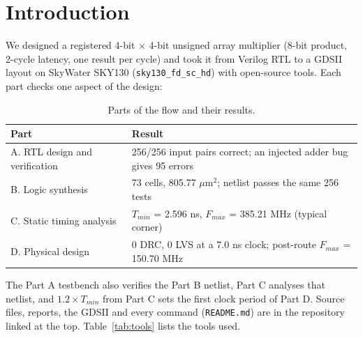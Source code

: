 \documentclass[10pt,a4paper,twocolumn]{article}
\newcommand{\umsq}{$\mu$m$^2$}
\begin{document}

\section{Introduction}

We designed a registered 4-bit $\times$ 4-bit unsigned array multiplier (8-bit product, 2-cycle latency,
one result per cycle) and took it from Verilog RTL to a GDSII layout on SkyWater SKY130 (\texttt{sky130\_fd\_sc\_hd})
with open-source tools. Each part checks one aspect of the design:

\begin{table}[!htbp]
\centering
\begin{tabularx}{\columnwidth}{>{\raggedright\arraybackslash}p{2.7cm}Y}
\toprule
\textbf{Part} & \textbf{Result} \\
\midrule
A. RTL design and verification & 256/256 input pairs correct; an injected adder bug gives 95 errors \\
B. Logic synthesis & 73 cells, 805.77 \umsq; netlist passes the same 256 tests \\
C. Static timing analysis & $T_{min}$ = 2.596 ns, $F_{max}$ = 385.21 MHz (typical corner) \\
D. Physical design & 0 DRC, 0 LVS at a 7.0 ns clock; post-route $F_{max}$ = 150.70 MHz \\
\bottomrule
\end{tabularx}
\caption{Parts of the flow and their results.}\label{tab:flow}
\end{table}

The Part A testbench also verifies the Part B netlist, Part C analyses that netlist, and $1.2 \times T_{min}$
from Part C sets the first clock period of Part D. Source files, reports, the GDSII and every command
(\texttt{README.md}) are in the repository linked at the top. Table~\ref{tab:tools} lists the tools used.
\end{document}
